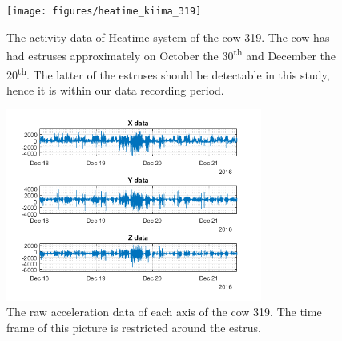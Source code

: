 \documentclass[english,12pt,a4paper,pdftex,elec,utf8]{aaltothesis}
\begin{document}
\begin{figure}[htb]
\centering
\texttt{[image: figures/heatime\_kiima\_319]}
\caption{The activity data of Heatime system of the cow 319. The cow has had estruses approximately on October the 30\textsuperscript{th} and December the 20\textsuperscript{th}. The latter of the estruses should be detectable in this study, hence it is within our data recording period.}
\label{heatime_kiima_319}
\end{figure}

\begin{figure}[htb]
\centering
\includegraphics[width = 0.75\textwidth]{figures/kiimadata_319.png}
\caption{The raw acceleration data of each axis of the cow 319. The time frame of this picture is restricted around the estrus.}
\label{kiimadata_319}
\end{figure}
\end{document}
